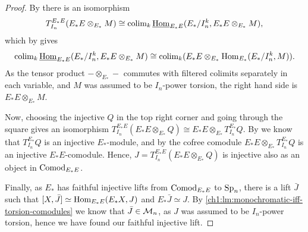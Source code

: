 \begin{proof}
    By \cite[5.5]{barthel-heard-valenzuela_2018} there is an isomorphism
    \[T^{E_*E}_{I_n} (E_*E\otimes_{E_*}M) \cong \operatorname{colim}_k \operatorname{\underline{Hom}}_{E_*E}(E_*/I_n^k, E_*E\otimes_{E_*}M),\]
    which by \cite[4.4]{barthel-heard-valenzuela_2018} gives
    \[\operatorname{colim}_k \operatorname{\underline{Hom}}_{E_*E}(E_*/I_n^k, E_*E\otimes_{E_*}M) \cong \operatorname{colim}_k (E_*E \otimes_{E_*} \operatorname{Hom}_{E_*}(E_*/I_n^k, M)).\]
    As the tensor product $-\otimes_{E_*}-$ commutes with filtered colimits separately in each variable, and $M$ was assumed to be $I_n$-power torsion, the right hand side is $E_*E\otimes_{E_*}M$.    
    
    Now, choosing the injective $Q$ in the top right corner and going through the square gives an isomorphism $T^{E_*E}_{I_n}(E_*E\otimes_{E_*}Q)\cong E_*E\otimes_{E_*}T_{I_n}^{E_*}Q$. By \cite[2.1.4]{brodmann-sharp_1998} we know that $T^{E_*}_{I_n}Q$ is an injective $E_*$-module, and by \cite[2.1(a)]{hovey-strickland_2005b} the cofree comodule $E_*E\otimes_{E_*} T^{E_*}_{I_n}Q$ is an injective $E_*E$-comodule. Hence, $J=T^{E_*E}_{I_n}(E_*E\otimes_{E_*}Q)$ is injective also as an object in $\mathrm{Comod}_{E_*E}$.

    Finally, as $E_*$ has faithful injective lifts from $\mathrm{Comod}_{E_*E}$ to $\mathrm{Sp}_{n}$, there is a lift $\bar{J}$ such that $[X,\bar{J}]\simeq \operatorname{Hom}_{E_*E}(E_*X, J)$ and $E_*\bar{J}\simeq J$. By \cref{ch1:lm:monochromatic-iff-torsion-comodules} we know that $\bar{J}\in \mathcal{M}_{n}$, as $J$ was assumed to be $I_n$-power torsion, hence we have found our faithful injective lift. 
\end{proof}

